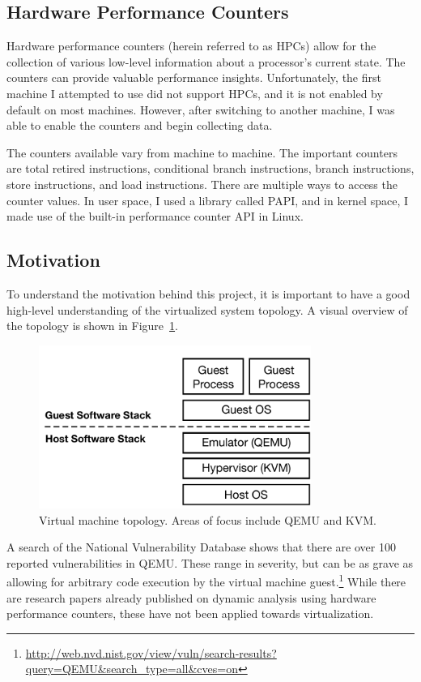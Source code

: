 \documentclass[notitlepage]{article}
\begin{document}
\subsection{Hardware Performance Counters}
Hardware performance counters (herein referred to as HPCs) allow for the
collection of various low-level information about a processor's current state.
The counters can provide valuable performance insights. Unfortunately, the first
machine I attempted to use did not support HPCs, and it is not enabled by
default on most machines.  However, after switching to another machine, I was
able to enable the counters and begin collecting data.

The counters available vary from machine to machine. The important counters are
total retired instructions, conditional branch instructions, branch
instructions, store instructions, and load instructions.  There are multiple
ways to access the counter values. In user space, I used a library called
PAPI\cite{papi}, and in kernel space, I made use of the built-in performance
counter API in Linux.

\subsection{Motivation}
To understand the motivation behind this project, it is important to have a good
high-level understanding of the virtualized system topology. A visual overview
of the topology is shown in Figure~\ref{fig:vmtop}.

\begin{figure}[htp]
    \centering
    \includegraphics[width=3.5in]{topology.pdf}
    \caption{Virtual machine topology. Areas of focus include QEMU and KVM.}
    \label{fig:vmtop}
\end{figure}

A search of the National Vulnerability Database shows that there are over
100 reported vulnerabilities in QEMU. These range in severity, but can be as grave
as allowing for arbitrary code execution by the virtual machine
guest.\footnote{\url{http://web.nvd.nist.gov/view/vuln/search-results?query=QEMU&search_type=all&cves=on}}
While there are research papers already published on dynamic analysis using
hardware performance counters, these have not been applied towards
virtualization\cite{numchecker}\cite{feasibility}\cite{pc}.
\end{document}
